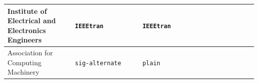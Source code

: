 \documentclass{styles/llncs}
\begin{document}
\begin{xtabular}{
		p{0.27\linewidth}
		p{0.27\linewidth}
		p{0.23\linewidth}
		m{0.23\linewidth}
	}
	Institute of Electrical and Electronics Engineers &\Verb|IEEEtran| & \Verb|IEEEtran|& \\ 
	\midrule
	Association for Computing Machinery & \Verb|sig-alternate|  & \Verb|plain| &    \\ 
	\midrule

\end{xtabular}
\end{document}
